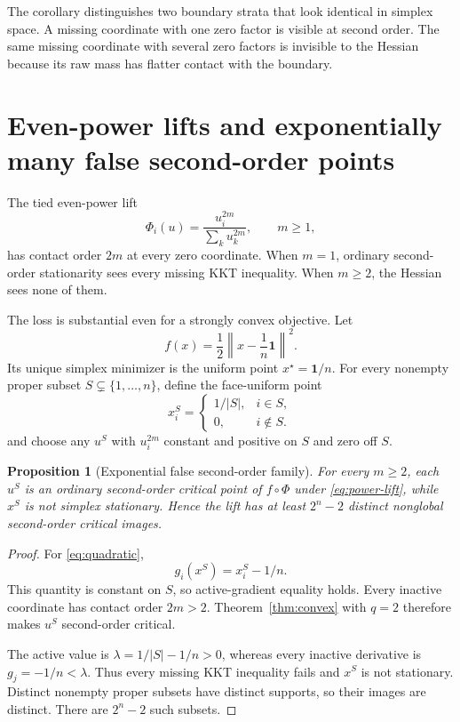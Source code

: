 \documentclass[11pt]{article}
\newtheorem{proposition}[theorem]{Proposition}
\theoremstyle{definition}
\theoremstyle{remark}
\begin{document}
The corollary distinguishes two boundary strata that look identical in
simplex space. A missing coordinate with one zero factor is visible at second
order. The same missing coordinate with several zero factors is invisible to
the Hessian because its raw mass has flatter contact with the boundary.

\section{Even-power lifts and exponentially many false second-order points}
\label{sec:powers}

The tied even-power lift
\begin{equation}\label{eq:power-lift}
  \Phi_i(u)=\frac{u_i^{2m}}{\sum_k u_k^{2m}},
  \qquad m\ge1,
\end{equation}
has contact order $2m$ at every zero coordinate. When $m=1$, ordinary
second-order stationarity sees every missing KKT inequality. When $m\ge2$,
the Hessian sees none of them.

The loss is substantial even for a strongly convex objective. Let
\begin{equation}\label{eq:quadratic}
  f(x)=\frac12\left\lVert x-\frac1n\mathbf1\right\rVert^2.
\end{equation}
Its unique simplex minimizer is the uniform point
$x^\star=\mathbf1/n$. For every nonempty proper subset
$S\subsetneq\{1,\ldots,n\}$, define the face-uniform point
\[
  x^S_i=
  \begin{cases}
    1/|S|,&i\in S,\\
    0,&i\notin S.
  \end{cases}
\]
and choose any $u^S$ with $u_i^{2m}$ constant and positive on $S$ and zero
off $S$.

\begin{proposition}[Exponential false second-order family]
\label{prop:exponential}
For every $m\ge2$, each $u^S$ is an ordinary second-order critical point of
$f\circ\Phi$ under \eqref{eq:power-lift}, while $x^S$ is not simplex
stationary. Hence the lift has at least $2^n-2$ distinct nonglobal
second-order critical images.
\end{proposition}

\begin{proof}
For \eqref{eq:quadratic},
\[
  g_i(x^S)=x^S_i-1/n.
\]
This quantity is constant on $S$, so active-gradient equality holds. Every
inactive coordinate has contact order $2m>2$. Theorem~\ref{thm:convex} with
$q=2$ therefore makes $u^S$ second-order critical.

The active value is $\lambda=1/|S|-1/n>0$, whereas every inactive derivative
is $g_j=-1/n<\lambda$. Thus every missing KKT inequality fails and $x^S$ is
not stationary. Distinct nonempty proper subsets have distinct supports, so
their images are distinct. There are $2^n-2$ such subsets.
\end{proof}
\end{document}
